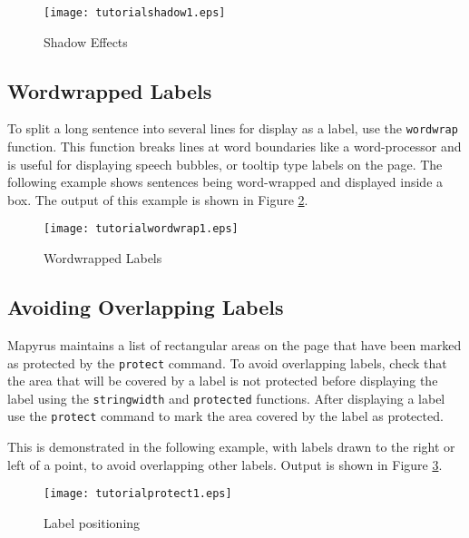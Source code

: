 

\begin{figure}[htb]
\texttt{[image: tutorialshadow1.eps]}
\caption{Shadow Effects}
\label{tutorialshadow1}
\end{figure}

\subsection{Wordwrapped Labels}

To split a long sentence into several lines for display as a label, use
the \texttt{wordwrap} function.
This function breaks lines at word boundaries like a word-processor
and is useful for displaying speech bubbles, or tooltip type
labels on the page.
The following example shows sentences being word-wrapped and
displayed inside a box.  The output of this example
is shown in Figure \ref{tutorialwordwrap1}.



\begin{figure}[htb]
\texttt{[image: tutorialwordwrap1.eps]}
\caption{Wordwrapped Labels}
\label{tutorialwordwrap1}
\end{figure}

\subsection{Avoiding Overlapping Labels}

Mapyrus maintains a list of rectangular
areas on the page that have been marked as protected by the
\texttt{protect} command.
To avoid overlapping labels, check that the area that will be
covered by a label is not protected before displaying the
label using the \texttt{stringwidth} and \texttt{protected} functions.
After displaying a label use the \texttt{protect} command to mark
the area covered by the label as protected.

This is demonstrated in the following example, with labels
drawn to the right or left of a point, to avoid overlapping
other labels.
Output is shown in Figure \ref{tutorialprotect1}.



\begin{figure}[htb]
\texttt{[image: tutorialprotect1.eps]}
\caption{Label positioning}
\label{tutorialprotect1}
\end{figure}

